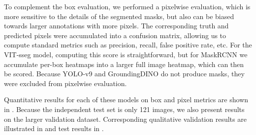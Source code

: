 To complement the box evaluation, we performed a pixelwise evaluation, which is more sensitive to the
  details of the segmented masks, but also can be biased towards larger annotations with more pixels.
The corresponding truth and predicted pixels were accumulated into a confusion matrix, allowing us to
  compute standard metrics \cite{powers_evaluation_2011} such as precision, recall, false positive rate, etc.
For the VIT-sseg model, computing this score is straightforward, but for MaskRCNN we accumulate per-box
  heatmaps into a larger full image heatmap, which can then be scored.
Because YOLO-v9 and GroundingDINO do not produce masks, they were excluded from pixelwise evaluation.

Quantitative results for each of these models on box and pixel metrics are shown in
  .
Because the independent test set is only 121 images, we also present results on the larger validation
  dataset.
Corresponding qualitative validation results are illustrated in  and
test results in .


\newcommand{\tb}[1]{\textbf{#1}}

\newcommand{\ResultCaption}{
\caption[]{
    Baseline model performance on validation and test sets.
    Suffixes indicate training conditions: -p (pretrained), -s (scratch), -t (tuned), -z (zero-shot).
    Metrics include box- and pixel-level AP (area under precision-recall), AUC (area under ROC), F1, and TPR (recall),
    computed using scikit-learn \cite{scikit-learn}.
    Pretrained models outperform with the tuned foundational Grounding DINO model performing best.
    Note: VIT-sseg was tuned more extensively and operated at full resolution, 
    while MaskRCNN, DINO, and YOLO used resized images and may improve with additional tuning.
}
\label{tab:model_results}
}

